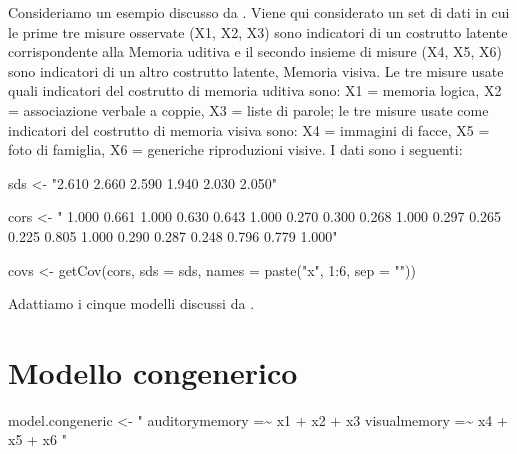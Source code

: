 \documentclass[
  11pt,
]{krantz}
\makeatletter
\newenvironment{Shaded}{\begin{snugshade}}{\end{snugshade}}
\newcommand{\AttributeTok}[1]{\textcolor[rgb]{0.61,0.61,0.61}{#1}}
\newcommand{\DecValTok}[1]{\textcolor[rgb]{0.06,0.06,0.06}{#1}}
\newcommand{\FunctionTok}[1]{\textcolor[rgb]{0,0,0}{#1}}
\newcommand{\NormalTok}[1]{#1}
\newcommand{\OtherTok}[1]{\textcolor[rgb]{0.37,0.37,0.37}{#1}}
\newcommand{\SpecialCharTok}[1]{\textcolor[rgb]{0,0,0}{#1}}
\newcommand{\StringTok}[1]{\textcolor[rgb]{0.5,0.5,0.5}{#1}}
\newenvironment{kframe}{%
\medskip{}
\setlength{\fboxsep}{.8em}
 \def\at@end@of@kframe{}%
 \ifinner\ifhmode%
  \def\at@end@of@kframe{\end{minipage}}%
  \begin{minipage}{\columnwidth}%
 \fi\fi%
 \def\FrameCommand##1{\hskip\@totalleftmargin \hskip-\fboxsep
 \colorbox{shadecolor}{##1}\hskip-\fboxsep
     \hskip-\linewidth \hskip-\@totalleftmargin \hskip\columnwidth}%
 \MakeFramed {\advance\hsize-\width
   \@totalleftmargin\z@ \linewidth\hsize
   \@setminipage}}%
 {\par\unskip\endMakeFramed%
 \at@end@of@kframe}
\renewenvironment{Shaded}{\begin{kframe}}{\end{kframe}}
\theoremstyle{definition}
\theoremstyle{definition}
\theoremstyle{definition}
\theoremstyle{definition}
\theoremstyle{remark}
\makeatother
\begin{document}
Consideriamo un esempio discusso da \citet{brown2015confirmatory}. Viene qui considerato un set di dati in cui le prime tre misure osservate (X1, X2, X3) sono indicatori di un costrutto latente corrispondente alla Memoria uditiva e il secondo insieme di misure (X4, X5, X6) sono indicatori di un altro costrutto latente, Memoria visiva. Le tre misure usate quali indicatori del costrutto di memoria uditiva sono: X1 = memoria logica, X2 = associazione verbale a coppie, X3 = liste di parole; le tre misure usate come indicatori del costrutto di memoria visiva sono: X4 = immagini di facce, X5 = foto di famiglia, X6 = generiche riproduzioni visive. I dati sono i seguenti:

\begin{Shaded}
\begin{Highlighting}[]
\NormalTok{sds }\OtherTok{\textless{}{-}} \StringTok{"2.610  2.660  2.590  1.940  2.030  2.050"}

\NormalTok{cors }\OtherTok{\textless{}{-}} \StringTok{"}
\StringTok{  1.000}
\StringTok{  0.661  1.000}
\StringTok{  0.630  0.643  1.000}
\StringTok{  0.270  0.300  0.268  1.000}
\StringTok{  0.297  0.265  0.225  0.805  1.000}
\StringTok{  0.290  0.287  0.248  0.796  0.779  1.000"}

\NormalTok{covs }\OtherTok{\textless{}{-}} \FunctionTok{getCov}\NormalTok{(cors, }\AttributeTok{sds =}\NormalTok{ sds, }\AttributeTok{names =} \FunctionTok{paste}\NormalTok{(}\StringTok{"x"}\NormalTok{, }\DecValTok{1}\SpecialCharTok{:}\DecValTok{6}\NormalTok{, }\AttributeTok{sep =} \StringTok{""}\NormalTok{))}
\end{Highlighting}
\end{Shaded}

Adattiamo i cinque modelli discussi da \citet{brown2015confirmatory}.

\hypertarget{modello-congenerico}{%
\section{Modello congenerico}\label{modello-congenerico}}

\begin{Shaded}
\begin{Highlighting}[]
\NormalTok{model.congeneric }\OtherTok{\textless{}{-}} \StringTok{"}
\StringTok{  auditorymemory =\textasciitilde{} x1 + x2 + x3}
\StringTok{  visualmemory   =\textasciitilde{} x4 + x5 + x6}
\StringTok{"}
\end{Highlighting}
\end{Shaded}
\end{document}
